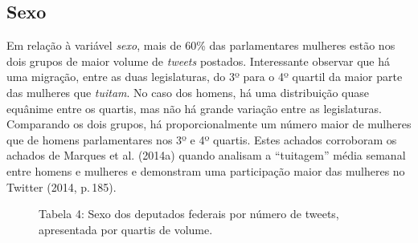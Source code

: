 
\subsection{Sexo}

Em relação à variável \textit{sexo}, mais de 60\% das parlamentares mulheres
estão nos dois grupos de maior volume de \emph{tweets} postados.
Interessante observar que há uma migração, entre as duas legislaturas,
do 3º para o 4º quartil da maior parte das mulheres que \emph{tuitam}.
No caso dos homens, há uma distribuição quase equânime entre os quartis,
mas não há grande variação entre as legislaturas. Comparando os dois
grupos, há proporcionalmente um número maior de mulheres que de homens
parlamentares nos 3º e 4º quartis. Estes achados corroboram os achados
de Marques et al. (2014a) quando analisam a ``tuitagem'' média semanal
entre homens e mulheres e demonstram uma participação maior das mulheres
no Twitter (2014, p.\,185).

\begin{figure}[!ht]


\caption{Tabela 4: Sexo dos deputados federais por número de tweets,
apresentada por quartis de volume.\footnotemark}
\end{figure}

